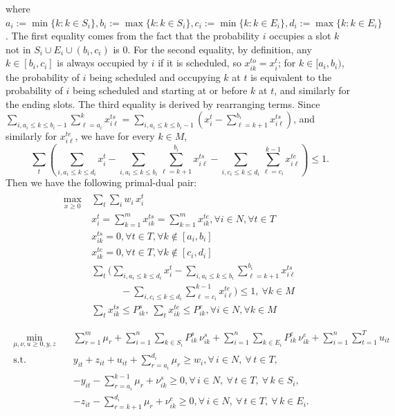 \documentclass[final,5p,times,twocolumn]{elsarticle}
\begin{document}
where $a_i:=\min\{k:k\in S_i\},b_i:=\max\{k:k\in S_i\},c_i:=\min\{k:k\in E_i\},d_i:=\max\{k:k\in E_i\}$.
The first equality comes from the fact that the probability $i$ occupies a slot $k$ not in $S_i\cup E_i\cup (b_i,c_i)$ is $0$.
For the second equality, by definition, any $k\in [b_i,c_i]$ is always occupied by $i$ if it is scheduled, so $x_{ik}^{to}=x_{i}^t$; for $k\in[a_i,b_i)$, the probability of $i$ being scheduled and occupying $k$ at $t$ is equivalent to the probability of $i$ being scheduled and starting at or before $k$ at $t$, and similarly for the ending slots.
The third equality is derived by rearranging terms.
Since $\sum_{i,a_i\leq k\leq b_i-1}\sum_{\ell = a_i}^{k}x_{i\ell}^{ts} = \sum_{i,a_i\leq k\leq b_i-1}(x_i^t-\sum_{\ell = k+1}^{b_i}x_{i\ell}^{ts})$, and similarly for $x_{i\ell}^{te}$, we have for every $k\in M$,
\begin{equation}
    \label{eq:2}
    \sum_{t}\left(\sum_{i, a_i\leq k\leq d_i} x_i^t-\sum_{i,a_i\leq k\leq b_i}\sum_{\ell = k+1}^{b_i}x_{i\ell}^{ts}-\sum_{i,c_i\leq k\leq d_i}\sum_{\ell =c_i}^{k-1}x_{i\ell}^{te}\right)\leq 1.
\end{equation}
Then we have the following primal-dual pair:
    \begin{align*}
    \label{DLP-P}
    \tag{DLP-P}
    \begin{split}
            \max_{x\geq 0}~&\sum_{t}\sum_i w_i\, x_{i}^{t}\\
    &x_i^t =\sum_{k=1}^{m}x_{ik}^{ts}=\sum_{k=1}^{m}x_{ik}^{te}, \forall i\in N,\forall t\in T\\
    &x_{ik}^{ts}=0,\forall t\in T,\forall k\notin [a_i,b_i]\\
    &x_{ik}^{te}=0,\forall t\in T,\forall k\notin [c_i,d_i]\\
& \sum_{t}\biggl(\sum_{i, a_i\leq k\leq d_i} x_i^t 
  - \sum_{i,a_i\leq k\leq b_i}\sum_{\ell = k+1}^{b_i}x_{i\ell}^{ts} \nonumber \\
& \qquad\quad - \sum_{i,c_i\leq k\leq d_i}\sum_{\ell =c_i}^{k-1}x_{i\ell}^{te}\biggr) \leq 1,
  ~\forall k\in M \\
    &\sum_{t}x_{ik}^{ts}\leq P_{ik}^{s},~\sum_{t}x_{ik}^{te}\leq P_{ik}^{e},\forall i\in N,\forall k\in M\\
    \end{split}
\end{align*}
\begin{align*}
\label{DLP-D}
    \tag{DLP-D}
\begin{split}
\min_{\mu,\nu,u\geq 0,y,z}\quad 
& \sum_{r=1}^{m} \mu_r
  + \sum_{i=1}^{n}\sum_{k\in S_i} P^s_{ik}\,\nu^s_{ik}
  + \sum_{i=1}^{n}\sum_{k\in E_i} P^e_{ik}\,\nu^e_{ik}
  + \sum_{i=1}^{n}\sum_{t=1}^{T} u_{it}\\
\text{s.t.}\quad 
& y_{it} + z_{it} + u_{it} + \sum_{r=a_i}^{d_i} \mu_r \geq w_i,
\forall\, i\in N,\ \forall\, t\in T, \\
& -y_{it} -\sum_{r=a_i}^{k-1} \mu_r+\nu^s_{ik}\geq0,\forall\, i\in N,\ \forall\, t\in T,\ \forall\, k\in S_i, \\
& -z_{it}-\sum_{r=k+1}^{d_i} \mu_r+\nu^e_{ik}\geq 0,\forall\, i\in N,\ \forall\, t\in T,\ \forall\, k\in E_i.
\end{split}
\end{align*}
\end{document}
